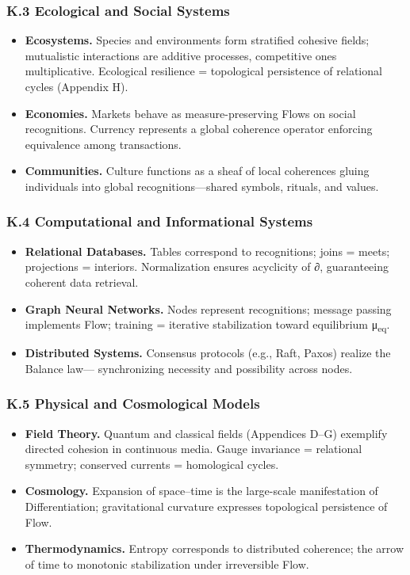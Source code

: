 \documentclass[11pt]{article}
\begin{document}
\subsubsection*{K.3 Ecological and Social Systems}
\label{sec:org16b1910}
\begin{itemize}
\item \textbf{\textbf{Ecosystems.}}  Species and environments form stratified cohesive fields;  
mutualistic interactions are additive processes, competitive ones multiplicative.  
Ecological resilience = topological persistence of relational cycles (Appendix H).
\item \textbf{\textbf{Economies.}}  Markets behave as measure-preserving Flows on social recognitions.  
Currency represents a global coherence operator enforcing equivalence among transactions.
\item \textbf{\textbf{Communities.}}  Culture functions as a sheaf of local coherences gluing individuals  
into global recognitions—shared symbols, rituals, and values.
\end{itemize}
\subsubsection*{K.4 Computational and Informational Systems}
\label{sec:orgea9b01e}
\begin{itemize}
\item \textbf{\textbf{Relational Databases.}}  Tables correspond to recognitions; joins = meets; projections = interiors.  
Normalization ensures acyclicity of ∂, guaranteeing coherent data retrieval.
\item \textbf{\textbf{Graph Neural Networks.}}  Nodes represent recognitions; message passing implements Flow;  
training = iterative stabilization toward equilibrium μ\textsubscript{eq}.
\item \textbf{\textbf{Distributed Systems.}}  Consensus protocols (e.g., Raft, Paxos) realize the Balance law—  
synchronizing necessity and possibility across nodes.
\end{itemize}
\subsubsection*{K.5 Physical and Cosmological Models}
\label{sec:orga7dc1c6}
\begin{itemize}
\item \textbf{\textbf{Field Theory.}}  Quantum and classical fields (Appendices D–G) exemplify directed cohesion in continuous media.  
Gauge invariance = relational symmetry; conserved currents = homological cycles.
\item \textbf{\textbf{Cosmology.}}  Expansion of space–time is the large-scale manifestation of Differentiation;  
gravitational curvature expresses topological persistence of Flow.
\item \textbf{\textbf{Thermodynamics.}}  Entropy corresponds to distributed coherence;  
the arrow of time to monotonic stabilization under irreversible Flow.
\end{itemize}
\end{document}
